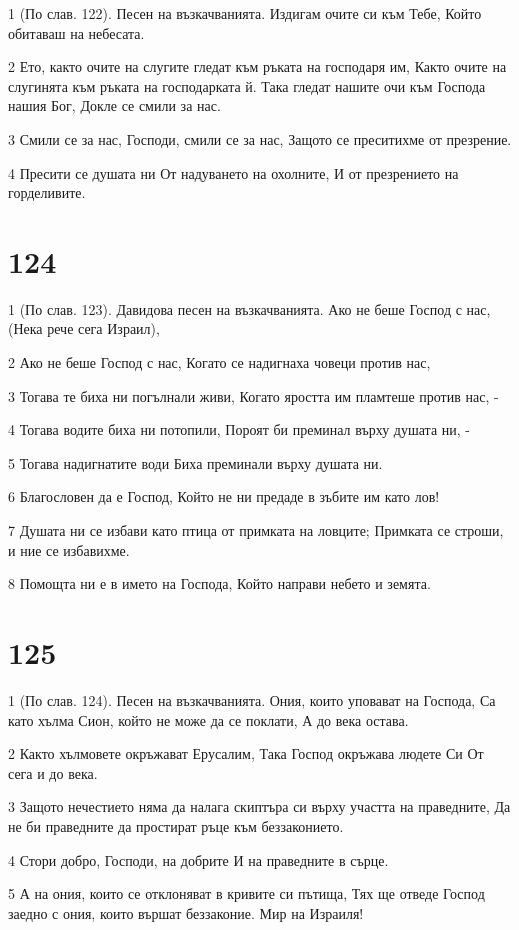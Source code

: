 \par 1 (По слав. 122). Песен на възкачванията. Издигам очите си към Тебе, Който обитаваш на небесата.
\par 2 Ето, както очите на слугите гледат към ръката на господаря им, Както очите на слугинята към ръката на господарката й. Така гледат нашите очи към Господа нашия Бог, Докле се смили за нас.
\par 3 Смили се за нас, Господи, смили се за нас, Защото се преситихме от презрение.
\par 4 Пресити се душата ни От надуването на охолните, И от презрението на горделивите.

\chapter{124}

\par 1 (По слав. 123). Давидова песен на възкачванията. Ако не беше Господ с нас, (Нека рече сега Израил),
\par 2 Ако не беше Господ с нас, Когато се надигнаха човеци против нас,
\par 3 Тогава те биха ни погълнали живи, Когато яростта им пламтеше против нас, -
\par 4 Тогава водите биха ни потопили, Пороят би преминал върху душата ни, -
\par 5 Тогава надигнатите води Биха преминали върху душата ни.
\par 6 Благословен да е Господ, Който не ни предаде в зъбите им като лов!
\par 7 Душата ни се избави като птица от примката на ловците; Примката се строши, и ние се избавихме.
\par 8 Помощта ни е в името на Господа, Който направи небето и земята.

\chapter{125}

\par 1 (По слав. 124). Песен на възкачванията. Ония, които уповават на Господа, Са като хълма Сион, който не може да се поклати, А до века остава.
\par 2 Както хълмовете окръжават Ерусалим, Така Господ окръжава людете Си От сега и до века.
\par 3 Защото нечестието няма да налага скиптъра си върху участта на праведните, Да не би праведните да простират ръце към беззаконието.
\par 4 Стори добро, Господи, на добрите И на праведните в сърце.
\par 5 А на ония, които се отклоняват в кривите си пътища, Тях ще отведе Господ заедно с ония, които вършат беззаконие. Мир на Израиля!

